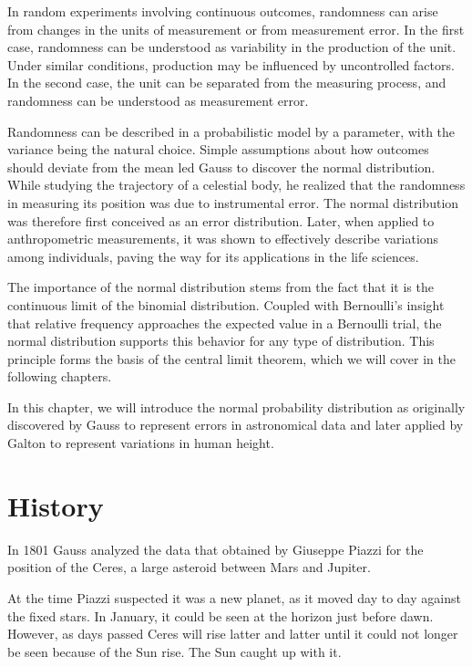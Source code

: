 \documentclass[
]{book}
\begin{document}
In random experiments involving continuous outcomes, randomness can arise from changes in the units of measurement or from measurement error. In the first case, randomness can be understood as variability in the production of the unit. Under similar conditions, production may be influenced by uncontrolled factors. In the second case, the unit can be separated from the measuring process, and randomness can be understood as measurement error.

Randomness can be described in a probabilistic model by a parameter, with the variance being the natural choice. Simple assumptions about how outcomes should deviate from the mean led Gauss to discover the normal distribution. While studying the trajectory of a celestial body, he realized that the randomness in measuring its position was due to instrumental error. The normal distribution was therefore first conceived as an error distribution. Later, when applied to anthropometric measurements, it was shown to effectively describe variations among individuals, paving the way for its applications in the life sciences.

The importance of the normal distribution stems from the fact that it is the continuous limit of the binomial distribution. Coupled with Bernoulli's insight that relative frequency approaches the expected value in a Bernoulli trial, the normal distribution supports this behavior for any type of distribution. This principle forms the basis of the central limit theorem, which we will cover in the following chapters.

In this chapter, we will introduce the normal probability distribution as originally discovered by Gauss to represent errors in astronomical data and later applied by Galton to represent variations in human height.

\hypertarget{history}{%
\section{History}\label{history}}

In 1801 Gauss analyzed the data that obtained by Giuseppe Piazzi for the position of the Ceres, a large asteroid between Mars and Jupiter.

At the time Piazzi suspected it was a new planet, as it moved day to day against the fixed stars. In January, it could be seen at the horizon just before dawn. However, as days passed Ceres will rise latter and latter until it could not longer be seen because of the Sun rise. The Sun caught up with it.
\end{document}
